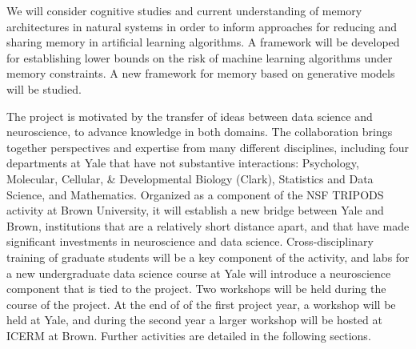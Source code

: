 We will consider cognitive studies and
current understanding of memory architectures in natural systems
in order to inform approaches for reducing and sharing memory in
artificial learning algorithms. A framework will be developed for
establishing lower bounds on the risk of machine learning algorithms under
memory constraints. A new framework for memory based on generative models
will be studied.
\vskip5pt

The project is motivated by the transfer of ideas between data science
and neuroscience, to advance knowledge in both domains. The
collaboration brings together perspectives and expertise from many
different disciplines, including four departments at Yale that have
not substantive interactions: Psychology, Molecular, Cellular, \&
Developmental Biology (Clark), Statistics and Data Science, and
Mathematics. Organized as a component of the NSF TRIPODS activity at
Brown University, it will establish a new bridge between Yale and
Brown, institutions that are a relatively short distance apart, and
that have made significant investments in neuroscience and data
science. Cross-disciplinary training of graduate students will be a
key component of the activity, and labs for a new undergraduate data
science course at Yale will introduce a neuroscience component that is
tied to the project.  Two workshops will be held during the course of
the project. At the end of of the first project year, a workshop will
be held at Yale, and during the second year a larger workshop will be
hosted at ICERM at Brown. Further activities are detailed in the
following sections.




